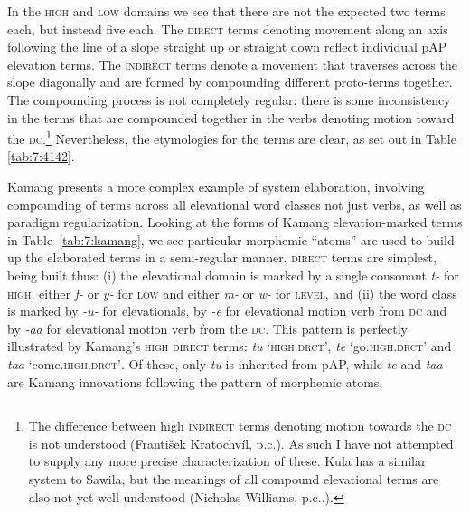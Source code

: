 In the \textsc{high} and \textsc{low} domains we see that there are not the expected two terms each, but instead five each. The \textsc{direct} terms denoting movement along an axis following the line of a slope straight up or straight down reflect individual pAP elevation terms. The \textsc{indirect} terms denote a movement that traverses across the slope diagonally and are formed by compounding different proto-terms together. The compounding process is not completely regular: there is some inconsistency in the terms that are compounded together in the verbs denoting motion toward the \textsc{dc}.\footnote{The difference between high \textsc{indirect} terms denoting motion towards the \textsc{dc} is not understood (Franti\v{s}ek Kratochvíl, p.c.). As such I have not attempted to supply any more precise characterization of these. Kula has a similar system to Sawila, but the meanings of all compound elevational terms are also not yet well understood (Nicholas Williams, p.c..).} Nevertheless, the etymologies for the terms are clear, as set out in Table~\enlargethispage{3em}  \ref{tab:7:4142}.


Kamang presents a more complex example of system elaboration, involving compounding of terms across all elevational word classes not just verbs, as well as paradigm regularization. Looking at the forms of Kamang elevation-marked terms in Table~\ref{tab:7:kamang}, we see particular morphemic ``atoms'' are used to build up the elaborated terms in a semi-regular manner. \textsc{direct} terms are simplest, being built thus: (i) the elevational domain is marked by a single consonant \textit{t-} for \textsc{high}, either \textit{f-} or \textit{y-} for \textsc{low} and either \textit{m-}  or \textit{w-} for \textsc{level}, and (ii) the word class is marked by \textit{{}-u-{\ng}} for elevationals, by \textit{{}-e} for elevational motion verb from \textsc{dc} and by \textit{{}-aa{\ng}} for elevational motion verb from the \textsc{dc}. This pattern is perfectly illustrated by Kamang's \textsc{high} \textsc{direct} terms: \textit{tu{\ng}} `\textsc{high.drct'}, \textit{te} `go.\textsc{high.drct'} and \textit{taa{\ng}} `come.\textsc{high.drct'}. Of these, only \textit{tu{\ng}} is inherited from pAP, while \textit{te} and \textit{taa{\ng}} are Kamang innovations following the pattern of morphemic atoms. 

